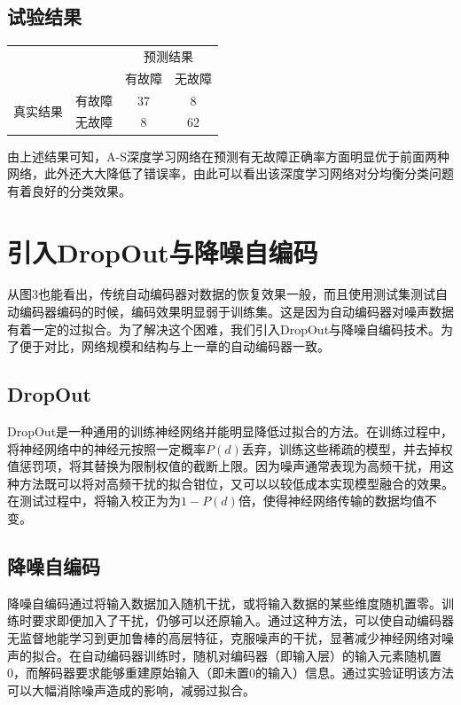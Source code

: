 \documentclass{ctacn}%
\begin{document}
\begin{multicols}{2}
\subsection{试验结果}

\begin{center}
	\label{tab:5}
	\begin{tabular} {cccc}\toprule
		\multirow{2}{*}[-2pt]{}&\multirow{2}{*}[-2pt]{}&\multicolumn{2}{c}{预测结果}\\
		\cmidrule(lr){3-4}
		&&有故障&无故障\\\hline
		\multirow{2}{*}[-2pt]{真实结果}&有故障&37&8\\
		&无故障&8&62\\
		\bottomrule
\end{tabular}\end{center}

由上述结果可知，A-S深度学习网络在预测有无故障正确率方面明显优于前面两种网络，此外还大大降低了错误率，由此可以看出该深度学习网络对分均衡分类问题有着良好的分类效果。

\section{引入DropOut与降噪自编码}
从图3也能看出，传统自动编码器对数据的恢复效果一般，而且使用测试集测试自动编码器编码的时候，编码效果明显弱于训练集。这是因为自动编码器对噪声数据有着一定的过拟合。为了解决这个困难，我们引入DropOut与降噪自编码技术。为了便于对比，网络规模和结构与上一章的自动编码器一致。

\subsection{DropOut}

DropOut是一种通用的训练神经网络并能明显降低过拟合的方法。在训练过程中，将神经网络中的神经元按照一定概率$P(d)$丢弃，训练这些稀疏的模型，并去掉权值惩罚项，将其替换为限制权值的截断上限。因为噪声通常表现为高频干扰，用这种方法既可以将对高频干扰的拟合钳位，又可以以较低成本实现模型融合的效果。在测试过程中，将输入校正为为$1-P(d)$倍，使得神经网络传输的数据均值不变。

\subsection{降噪自编码}
降噪自编码通过将输入数据加入随机干扰，或将输入数据的某些维度随机置零。训练时要求即便加入了干扰，仍够可以还原输入。通过这种方法，可以使自动编码器无监督地能学习到更加鲁棒的高层特征，克服噪声的干扰，显著减少神经网络对噪声的拟合。在自动编码器训练时，随机对编码器（即输入层）的输入元素随机置0，而解码器要求能够重建原始输入（即未置0的输入）信息。通过实验证明该方法可以大幅消除噪声造成的影响，减弱过拟合。


\end{multicols}
\end{document}
